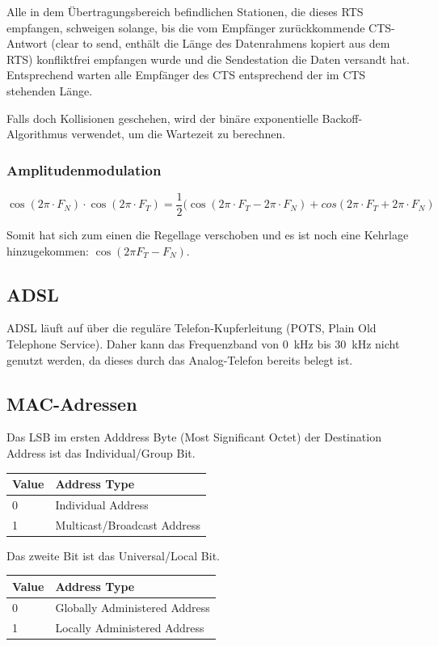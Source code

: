Alle in dem Übertragungsbereich befindlichen Stationen, die dieses RTS
empfangen, schweigen solange, bis die vom Empfänger zurückkommende CTS-Antwort
(clear to send, enthält die Länge des Datenrahmens kopiert aus dem RTS)
konfliktfrei empfangen wurde und die Sendestation die Daten versandt hat.
Entsprechend warten alle Empfänger des CTS entsprechend der im CTS stehenden
Länge.

Falls doch Kollisionen geschehen, wird der binäre exponentielle
Backoff-Algorithmus verwendet, um die Wartezeit zu berechnen.


\subsubsection{Amplitudenmodulation}

\[
	\cos (2\pi \cdot F_N) \cdot \cos (2\pi \cdot F_T)
	= \frac{1}{2}(\cos (2\pi \cdot F_T - 2\pi \cdot F_N)
	+ cos(2\pi \cdot F_T + 2\pi \cdot F_N)
\]

Somit hat sich zum einen die Regellage verschoben und es ist noch eine Kehrlage
hinzugekommen: $\cos (2\pi F_T - F_N)$.


\subsection{ADSL}

ADSL läuft auf über die reguläre Telefon-Kupferleitung (POTS, Plain Old
Telephone Service). Daher kann das Frequenzband von 0~kHz bis 30~kHz nicht
genutzt werden, da dieses durch das Analog-Telefon bereits belegt ist.


\subsection{MAC-Adressen}

Das LSB im ersten Adddress Byte (Most Significant Octet) der Destination Address
ist das Individual/Group Bit.

\begin{tabular}[h]{|l|l|}
	\hline
  \textbf{Value} & \textbf{Address Type} \\
	\hline
  0 & Individual Address \\
  1 & Multicast/Broadcast Address \\
	\hline
\end{tabular}

Das zweite Bit ist das Universal/Local Bit.

\begin{tabular}[h]{|l|l|}
	\hline
  \textbf{Value} & \textbf{Address Type} \\
	\hline
  0 & Globally Administered Address \\
  1 & Locally Administered Address \\
	\hline
\end{tabular}

